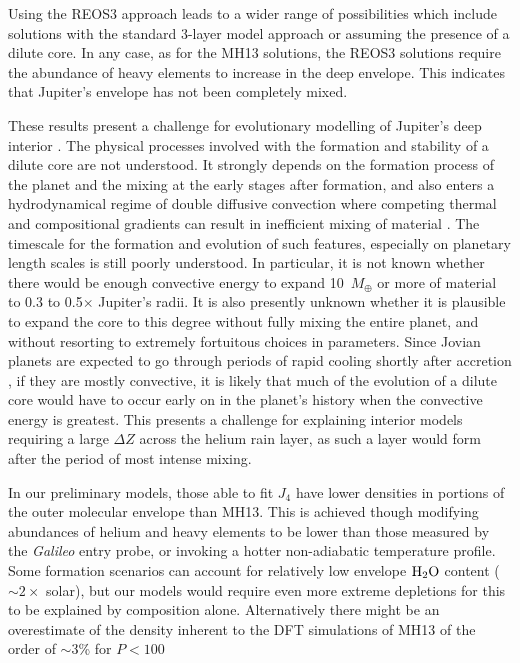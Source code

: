 Using the REOS3 approach leads to a wider range of possibilities which include
solutions with the standard 3-layer model approach or assuming the presence of
a dilute core.  In any case, as for the MH13 solutions, the REOS3 solutions
require the abundance of heavy elements to increase in the deep envelope. This
indicates that Jupiter's envelope has not been completely mixed. 

These results present a challenge for evolutionary modelling of Jupiter's deep
interior  \citep[e.g.][]{vazan2016,mankovich2016}.  The physical processes
involved with the formation and stability of a dilute core are not understood.
It strongly depends on the formation process of the planet and the mixing at
the early stages after formation, and also enters a hydrodynamical regime of
double diffusive convection where competing thermal and compositional gradients
can result in inefficient mixing of material \citep{Leconte2012,Mirouh2012}.
The timescale for the formation and evolution of such features, especially on
planetary length scales is still poorly understood.  In particular, it is not
known whether there would be enough convective energy to expand 10~$M_\oplus$
or more of material to 0.3 to 0.5$\times$ Jupiter's radii. It is also presently
unknown whether it is plausible to expand the core to this degree without fully
mixing the entire planet, and without resorting to extremely fortuitous choices
in parameters.  Since Jovian planets are expected to go through periods of
rapid cooling shortly after accretion \citep{Fortney2010}, if they are mostly
convective, it is likely that much of the evolution of a dilute core would
have to occur early on in the planet's history when the convective energy is
greatest. This presents a challenge for explaining interior models requiring a
large $\Delta Z$ across the helium rain layer, as such a layer would form after the
period of most intense mixing.

In our preliminary models, those able to fit $J_4$ have lower densities in
portions of the outer molecular envelope than MH13. This is achieved though
modifying abundances of helium and heavy elements to be lower than those measured by
the \textit{Galileo} entry probe, or invoking a hotter non-adiabatic
temperature profile. Some formation scenarios \citep[e.g.][]{Mousis2012} can
account for relatively low envelope ${\rm H}_2{\rm O}$ content ($\sim2\times$
solar), but our models would require even more extreme depletions for this
to be explained by composition alone.  Alternatively there might be an
overestimate of the density inherent to the DFT simulations of MH13 of the
order of $\sim$3\% for $P<100$

